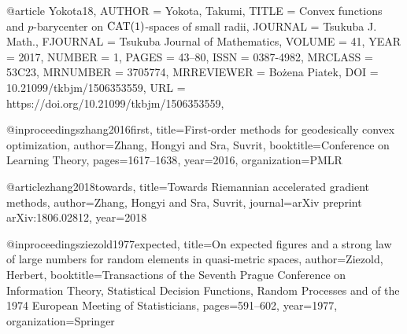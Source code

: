 @article {Yokota18,
    AUTHOR = {Yokota, Takumi},
     TITLE = {Convex functions and {$p$}-barycenter on {${\rm
              CAT}(1)$}-spaces of small radii},
   JOURNAL = {Tsukuba J. Math.},
  FJOURNAL = {Tsukuba Journal of Mathematics},
    VOLUME = {41},
      YEAR = {2017},
    NUMBER = {1},
     PAGES = {43--80},
      ISSN = {0387-4982},
   MRCLASS = {53C23},
  MRNUMBER = {3705774},
MRREVIEWER = {Bo\.{z}ena Pi\polhk atek},
       DOI = {10.21099/tkbjm/1506353559},
       URL = {https://doi.org/10.21099/tkbjm/1506353559},
}

@inproceedings{zhang2016first,
  title={First-order methods for geodesically convex optimization},
  author={Zhang, Hongyi and Sra, Suvrit},
  booktitle={Conference on Learning Theory},
  pages={1617--1638},
  year={2016},
  organization={PMLR}
}

@article{zhang2018towards,
  title={Towards Riemannian accelerated gradient methods},
  author={Zhang, Hongyi and Sra, Suvrit},
  journal={arXiv preprint arXiv:1806.02812},
  year={2018}
}

@inproceedings{ziezold1977expected,
  title={On expected figures and a strong law of large numbers for random elements in quasi-metric spaces},
  author={Ziezold, Herbert},
  booktitle={Transactions of the Seventh Prague Conference on Information Theory, Statistical Decision Functions, Random Processes and of the 1974 European Meeting of Statisticians},
  pages={591--602},
  year={1977},
  organization={Springer}
}